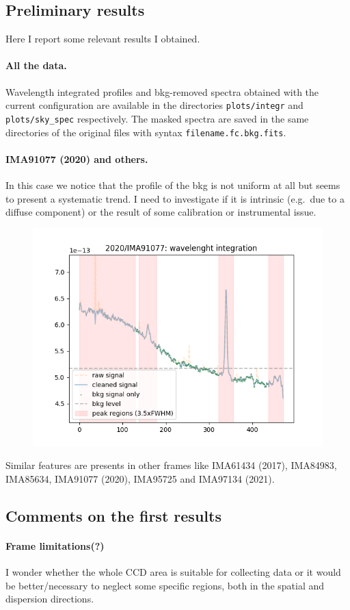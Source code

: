 \documentclass{article}
\begin{document}
\subsection{Preliminary results}
Here I report some relevant results I obtained.

\paragraph{All the data.} Wavelength integrated profiles and bkg-removed spectra obtained with the current configuration are available in the directories \texttt{plots/integr} and \texttt{plots/sky\_spec} respectively. The masked spectra are saved in the same directories of the original files with syntax \texttt{filename.fc.bkg.fits}.

\paragraph{IMA91077 (2020) and others.} In this case we notice that the profile of the bkg is not uniform at all but seems to present a systematic trend. I need to investigate if it is intrinsic (e.g.\ due to a diffuse component) or the result of some calibration or instrumental issue.
\begin{figure}[h!]
		\centering
		\includegraphics[width=.49\textwidth]{2020_IMA91077}
\end{figure}
Similar features are presents in other frames like IMA61434 (2017), IMA84983, IMA85634, IMA91077 (2020), IMA95725 and IMA97134 (2021).

\subsection{Comments on the first results}

\paragraph{Frame limitations(?)} I wonder whether the whole CCD area is suitable for collecting data or it would be better/necessary to neglect some specific regions, both in the spatial and dispersion directions.
\end{document}
